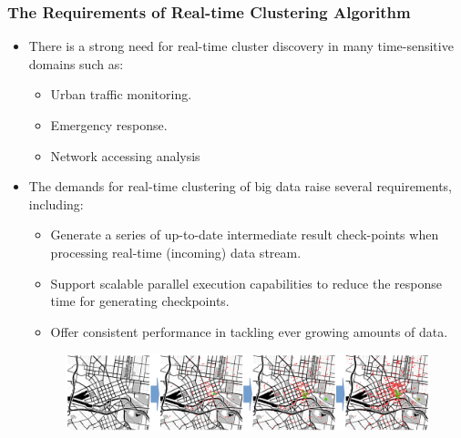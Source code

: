 \begin{frame}
    \frametitle{The Requirements of Real-time Clustering Algorithm}
    \begin{itemize} \small
	    \item There is a strong need for real-time cluster discovery in many time-sensitive domains such as:
        \begin{itemize} \small
            \item Urban traffic monitoring.
            \item Emergency response.
            \item Network accessing analysis
        \end{itemize}
	    \item The demands for real-time clustering of big data raise several requirements, including:
        \begin{itemize} \small
            \item Generate a series of up-to-date intermediate result check-points when processing real-time (incoming) data stream.
            \item Support scalable parallel execution capabilities to reduce the response time for generating checkpoints. 
            \item Offer consistent performance in tackling ever growing amounts of data.
        \end{itemize}
        \begin{figure}
            \centering
            \includegraphics[width=0.6\linewidth]{resource/figures/cluster_checkpoints.png}
        \end{figure}
    \end{itemize}
\end{frame}

